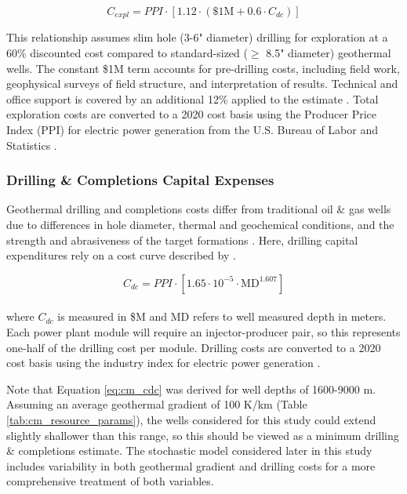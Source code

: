 \begin{equation}
\label{eq:cm_capex_expl}
    C_{expl} = PPI \cdot \left[ 1.12 \cdot (\$1\text{M} + 0.6\cdot C_{dc}) \right]
\end{equation}

This relationship assumes slim hole (3-6" diameter) drilling for exploration at a 60\% discounted cost compared to standard-sized ($\geq$ 8.5" diameter) geothermal wells. The constant \$1M term accounts for pre-drilling costs, including field work, geophysical surveys of field structure, and interpretation of results. Technical and office support is covered by an additional 12\% applied to the estimate \citep{eere_getem_2012}. Total exploration costs are converted to a 2020 cost basis using the Producer Price Index (PPI) for electric power generation from the U.S. Bureau of Labor and Statistics \citep{us_bls_ppi_2021}.

\subsubsection{Drilling \& Completions Capital Expenses} 
\label{ch4:cm_capex_dc}

Geothermal drilling and completions costs differ from traditional oil \& gas wells due to differences in hole diameter, thermal and geochemical conditions, and the strength and abrasiveness of the target formations \citep{lowry_geovision_2017}. Here, drilling capital expenditures rely on a cost curve described by \citet[Equation 4,\ ][]{beckers_introducing_2013}.

\begin{equation}
\label{eq:cm_cdc}
    C_{dc} = PPI \cdot \left[ 1.65 \cdot 10^{-5} \cdot \text{MD}^{1.607} \right]
\end{equation}
\\
where $C_{dc}$ is measured in \$M and MD refers to well measured depth in meters. Each power plant module will require an injector-producer pair, so this represents one-half of the drilling cost per module. Drilling costs are converted to a 2020 cost basis using the industry index for electric power generation \citep{us_bls_ppi_2021}. 

Note that Equation \ref{eq:cm_cdc} was derived for well depths of 1600-9000 m. Assuming an average geothermal gradient of 100 K/km (Table \ref{tab:cm_resource_params}), the wells considered for this study could extend slightly shallower than this range, so this should be viewed as a minimum drilling \& completions estimate. The stochastic model considered later in this study includes variability in both geothermal gradient and drilling costs for a more comprehensive treatment of both variables.

